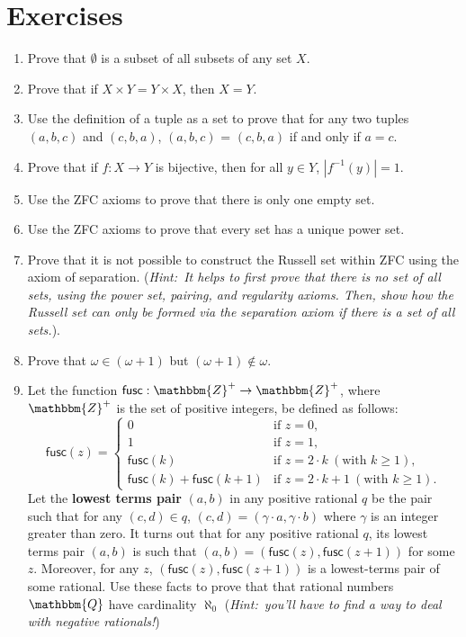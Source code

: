 \documentclass[11pt]{article}
\theoremstyle{definition}
\theoremstyle{remark}
\begin{document}
\section*{Exercises}
\begin{enumerate}
    \item Prove that $\emptyset$ is a subset of all subsets of any set $X$.

    \item Prove that if $X\times Y = Y\times X$, then $X=Y$.

    \item Use the definition of a tuple as a set to prove that for any two tuples $(a,b,c)$ and $(c,b,a)$, $(a,b,c)$ = $(c,b,a)$ if and only if $a=c$.

    \item Prove that if $f:X\rightarrow Y$ is bijective, then for all $y\in Y$, $|f^{-1}(y)|=1$. 

    \item Use the ZFC axioms to prove that there is only one empty set.

    \item Use the ZFC axioms to prove that every set has a unique power set.

    \item Prove that it is not possible to construct the Russell set within ZFC using the axiom of separation. (\textit{Hint:\ It helps to first prove that there is no set of all sets, using the power set, pairing, and regularity axioms. Then, show how the Russell set can only be formed via the separation axiom if there is a set of all sets.}).

    \item Prove that $\omega\in(\omega+1)$ but $(\omega + 1)\not\in\omega$. 

    \item Let the function $\textsf{fusc}:\mathbbm{Z}^{+}\rightarrow\mathbbm{Z}^{+}$, where $\mathbbm{Z}^{+}$ is the set of positive integers, be defined as follows:
    \begin{equation*}
    \textsf{fusc}(z) =
    \begin{cases}
        0 & \text{if } z = 0, \\[6pt]
        1 & \text{if } z = 1, \\[6pt]
        \textsf{fusc}(k) & \text{if } z = 2\cdot k \ (\text{with } k \geq 1), \\[6pt]
        \textsf{fusc}(k) + \textsf{fusc}(k+1) & \text{if } z = 2\cdot k+1 \ (\text{with } k \geq 1).
    \end{cases}
    \end{equation*}
        Let the \textbf{lowest terms pair} $(a,b)$ in any positive rational $q$ be the pair such that for any $(c,d)\in q$, $(c,d)=(\gamma \cdot a,\gamma \cdot b)$ where $\gamma$ is an integer greater than zero. It turns out that for any positive rational $q$, its lowest terms pair $(a,b)$ is such that $(a,b)=(\textsf{fusc}(z),\textsf{fusc}(z+1))$ for some $z$. Moreover, for any $z$, $(\textsf{fusc}(z),\textsf{fusc}(z+1))$ is a lowest-terms pair of some rational. Use these facts to prove that that rational numbers $\mathbbm{Q}$ have cardinality $\aleph_{0}$ (\textit{Hint:\ you'll have to find a way to deal with negative rationals!})
\end{enumerate}
\end{document}
